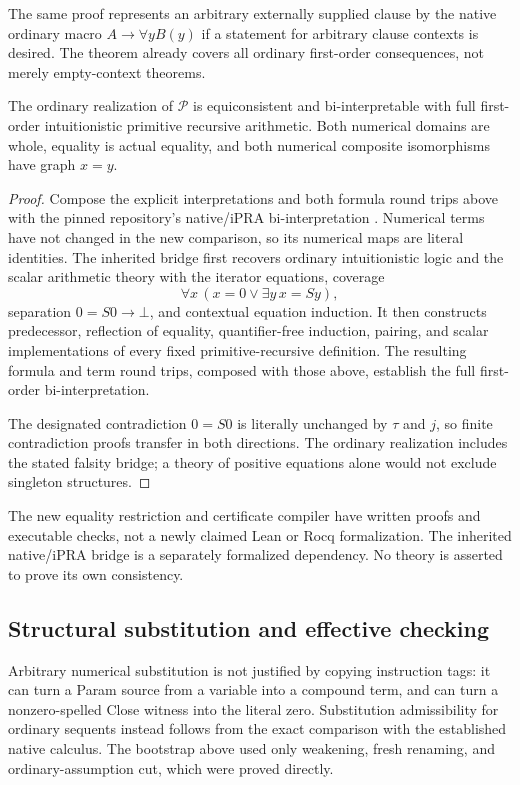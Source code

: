 The same proof represents an arbitrary externally supplied clause by
the native ordinary macro $A\to\forall yB(y)$ if a statement for arbitrary
clause contexts is desired.  The theorem already covers all ordinary
first-order consequences, not merely empty-context theorems.

\begin{corollary}
The ordinary realization of $\mathcal P$ is equiconsistent and
bi-interpretable with full first-order intuitionistic primitive recursive
arithmetic.  Both numerical domains are whole, equality is actual
equality, and both numerical composite isomorphisms have graph $x=y$.
\end{corollary}
\begin{proof}
Compose the explicit interpretations and both formula round trips above
with the pinned repository's native/iPRA bi-interpretation
\cite{nativebiinterp}.  Numerical terms have not changed in the new
comparison, so its numerical maps are literal identities.  The inherited
bridge first recovers ordinary intuitionistic logic and the scalar
arithmetic theory with the iterator equations, coverage
\[
 \forall x\,(x=0\lor\exists y\,x=Sy),
\]
separation $0=S0\to\bot$, and contextual equation induction.  It then
constructs predecessor, reflection of equality, quantifier-free induction,
pairing, and scalar implementations of every fixed primitive-recursive
definition.  The resulting formula and term round trips, composed with
those above, establish the full first-order bi-interpretation.

The designated contradiction $0=S0$ is literally unchanged by $\tau$
and $j$, so finite contradiction proofs transfer in both directions.
The ordinary realization includes the stated falsity bridge; a theory
of positive equations alone would not exclude singleton structures.
\end{proof}

The new equality restriction and certificate compiler have written proofs
and executable checks, not a newly claimed Lean or Rocq formalization.
The inherited native/iPRA bridge is a separately formalized dependency.
No theory is asserted to prove its own consistency.

\subsection{Structural substitution and effective checking}

Arbitrary numerical substitution is not justified by copying instruction
tags: it can turn a Param source from a variable into a compound term,
and can turn a nonzero-spelled Close witness into the literal zero.
Substitution admissibility for ordinary sequents instead follows from the
exact comparison with the established native calculus.  The bootstrap
above used only weakening, fresh renaming, and ordinary-assumption cut,
which were proved directly.


